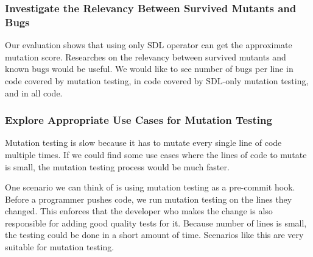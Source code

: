 \documentclass[12pt]{article}
\begin{document}
\subsubsection{Investigate the Relevancy Between Survived Mutants and Bugs}

Our evaluation shows that using only SDL operator can get the approximate mutation score. Researches on the relevancy between survived mutants and known bugs would be useful. We would like to see number of bugs per line in code covered by mutation testing, in code covered by SDL-only mutation testing, and in all code.

\subsubsection{Explore Appropriate Use Cases for Mutation Testing}

Mutation testing is slow because it has to mutate every single line of code multiple times. If we could find some use cases where the lines of code to mutate is small, the mutation testing process would be much faster.

One scenario we can think of is using mutation testing as a pre-commit hook. Before a programmer pushes code, we run mutation testing on the lines they changed. This enforces that the developer who makes the change is also responsible for adding good quality tests for it. Because number of lines is small, the testing could be done in a short amount of time. Scenarios like this are very suitable for mutation testing.

\begin{appendices}
\end{appendices}



\end{document}
